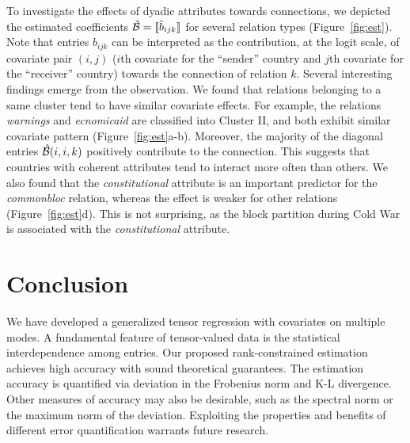 \documentclass[12pt]{article}
\theoremstyle{plain}
\theoremstyle{definition}
\begin{document}
To investigate the effects of dyadic attributes towards connections, we depicted the estimated coefficients $\hat {\mathcal{B}}=\llbracket \hat b_{ijk} \rrbracket$ for several relation types (Figure~\ref{fig:est}). Note that entries $\hat b_{ijk}$ can be interpreted as the contribution, at the logit scale, of covariate pair $(i,j)$ ($i$th covariate for the ``sender'' country and $j$th covariate for the ``receiver'' country) towards the connection of relation $k$.  Several interesting findings emerge from the observation. We found that relations belonging to a same cluster tend to have similar covariate effects. For example, the relations \emph{warnings} and \emph{ecnomicaid} are classified into Cluster II, and both exhibit similar covariate pattern (Figure~\ref{fig:est}a-b). Moreover, the majority of the diagonal entries $\hat {\mathcal{B}}(i,i,k)$ positively contribute to the connection. This suggests that countries with coherent attributes tend to interact more often than others. We also found that the \emph{constitutional} attribute is an important predictor for the \emph{commonbloc} relation, whereas the effect is weaker for other relations (Figure~\ref{fig:est}d). This is not surprising, as the block partition during Cold War is associated with the \emph{constitutional} attribute. 


\section{Conclusion}\label{sec:con}

We have developed a generalized tensor regression with covariates on multiple modes. A fundamental feature of tensor-valued data is the statistical interdependence among entries. Our proposed rank-constrained estimation achieves high accuracy with sound theoretical guarantees. The estimation accuracy is quantified via deviation in the Frobenius norm and K-L divergence. Other measures of accuracy may also be desirable, such as the spectral norm or the maximum norm of the deviation. Exploiting the properties and benefits of different error quantification warrants future research.
 
\end{document}
